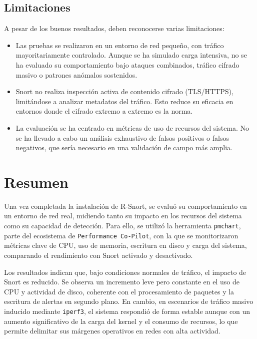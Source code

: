 \documentclass[11pt,a4paper,twoside]{report}
\begin{document}
\subsection*{Limitaciones}

A pesar de los buenos resultados, deben reconocerse varias limitaciones:

\begin{itemize}
	\item Las pruebas se realizaron en un entorno de red pequeño, con tráfico mayoritariamente controlado. Aunque se ha simulado carga intensiva, no se ha evaluado su comportamiento bajo ataques combinados, tráfico cifrado masivo o patrones anómalos sostenidos.
	\item Snort no realiza inspección activa de contenido cifrado (TLS/HTTPS), limitándose a analizar metadatos del tráfico. Esto reduce su eficacia en entornos donde el cifrado extremo a extremo es la norma.
	\item La evaluación se ha centrado en métricas de uso de recursos del sistema. No se ha llevado a cabo un análisis exhaustivo de falsos positivos o falsos negativos, que sería necesario en una validación de campo más amplia.
\end{itemize}

\pagebreak

\section{Resumen}

Una vez completada la instalación de R-Snort, se evaluó su comportamiento en un entorno de red real, midiendo tanto su impacto en los recursos del sistema como su capacidad de detección. Para ello, se utilizó la herramienta \texttt{pmchart}, parte del ecosistema de \texttt{Performance Co-Pilot}, con la que se monitorizaron métricas clave de CPU, uso de memoria, escritura en disco y carga del sistema, comparando el rendimiento con Snort activado y desactivado.\newline

Los resultados indican que, bajo condiciones normales de tráfico, el impacto de Snort es reducido. Se observa un incremento leve pero constante en el uso de CPU y actividad de disco, coherente con el procesamiento de paquetes y la escritura de alertas en segundo plano. En cambio, en escenarios de tráfico masivo inducido mediante \texttt{iperf3}, el sistema respondió de forma estable aunque con un aumento significativo de la carga del kernel y el consumo de recursos, lo que permite delimitar sus márgenes operativos en redes con alta actividad.\newline
\end{document}
